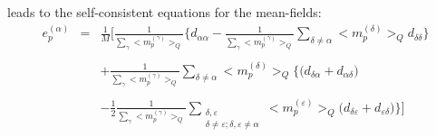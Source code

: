 leads to the self-consistent equations for the mean-fields:
\begin{equation}
	\begin{array}{lll}
		e_p^{(\alpha)}
		& = & \frac{1}{M} \Bigg[ \frac{1}{\sum\limits_\gamma 
			\big< m_p^{(\gamma)} \big>_Q}
			\Bigg\{ d_{\alpha\alpha} - 
				\frac{1}{\sum\limits_\gamma 
				\big< m_p^{(\gamma)} 
			\big>_Q}
			\sum\limits_{\delta \neq \alpha} \big< m_p^{(\delta)}
				\big>_Q d_{\delta\delta} \Bigg\} \\\\
		&& + \frac{1}{\sum\limits_\gamma \big< m_p^{(\gamma)} 
			\big>_Q} \sum\limits_{\delta \neq \alpha} 
				\big< m_p^{(\delta)} \big>_Q
			\Bigg\{ \big( d_{\delta\alpha} + d_{\alpha\delta} 
			\big) \\\\
		&& -\frac{1}{2} \frac{1}{\sum\limits_\gamma 
			\big< m_p^{(\gamma)} \big>_Q}
			\sum\limits_{\substack{\delta, \varepsilon \\
				\delta \neq \varepsilon; \delta, \varepsilon
					\neq \alpha}} 
				\big< m_p^{(\varepsilon)} \big>_Q
				\big( d_{\delta\varepsilon} 
				+ d_{\varepsilon\delta} \big)
			\Bigg\}
		\Bigg]
	\end{array}
\end{equation}
